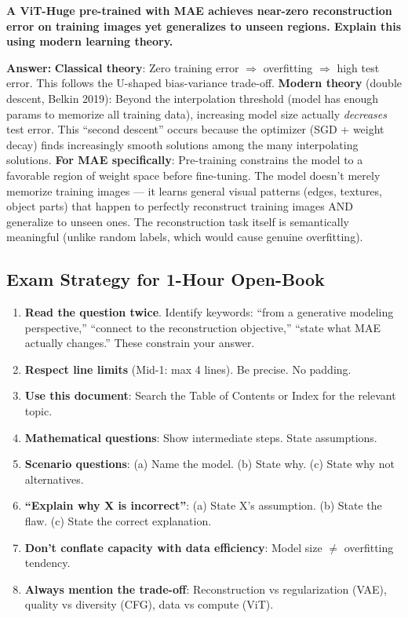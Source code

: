 \begin{examq}
\textbf{A ViT-Huge pre-trained with MAE achieves near-zero reconstruction error on training images yet generalizes to unseen regions. Explain this using modern learning theory.}

\textbf{Answer:} \textbf{Classical theory}: Zero training error $\Rightarrow$ overfitting $\Rightarrow$ high test error. This follows the U-shaped bias-variance trade-off. \textbf{Modern theory} (double descent, Belkin 2019): Beyond the interpolation threshold (model has enough params to memorize all training data), increasing model size actually \textit{decreases} test error. This ``second descent'' occurs because the optimizer (SGD + weight decay) finds increasingly smooth solutions among the many interpolating solutions. \textbf{For MAE specifically}: Pre-training constrains the model to a favorable region of weight space before fine-tuning. The model doesn't merely memorize training images — it learns general visual patterns (edges, textures, object parts) that happen to perfectly reconstruct training images AND generalize to unseen ones. The reconstruction task itself is semantically meaningful (unlike random labels, which would cause genuine overfitting).
\end{examq}

\subsection{Exam Strategy for 1-Hour Open-Book}

\begin{warnbox}
\begin{enumerate}
\item \textbf{Read the question twice}. Identify keywords: ``from a generative modeling perspective,'' ``connect to the reconstruction objective,'' ``state what MAE actually changes.'' These constrain your answer.
\item \textbf{Respect line limits} (Mid-1: max 4 lines). Be precise. No padding.
\item \textbf{Use this document}: Search the Table of Contents or Index for the relevant topic.
\item \textbf{Mathematical questions}: Show intermediate steps. State assumptions.
\item \textbf{Scenario questions}: (a) Name the model. (b) State why. (c) State why not alternatives.
\item \textbf{``Explain why X is incorrect''}: (a) State X's assumption. (b) State the flaw. (c) State the correct explanation.
\item \textbf{Don't conflate capacity with data efficiency}: Model size $\neq$ overfitting tendency.
\item \textbf{Always mention the trade-off}: Reconstruction vs regularization (VAE), quality vs diversity (CFG), data vs compute (ViT).
\end{enumerate}
\end{warnbox}

